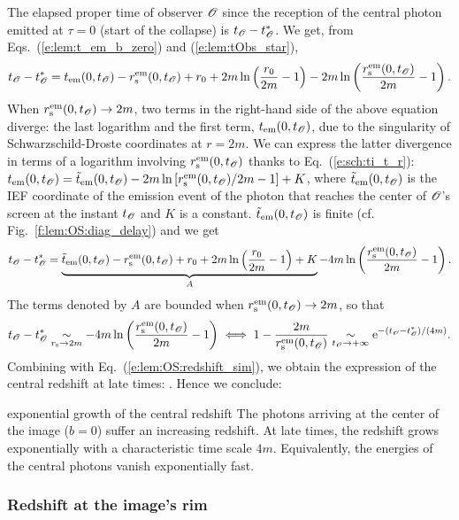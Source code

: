 The elapsed proper time of observer $\mathscr{O}$
since the reception of the central photon emitted
at $\tau = 0$ (start of the collapse) is $t_{\mathscr{O}} - t_{\mathscr{O}}^*$.
We get, from Eqs.~(\ref{e:lem:t_em_b_zero}) and (\ref{e:lem:tObs_star}),
\[
    t_{\mathscr{O}} - t_{\mathscr{O}}^* =  t_{\rm em}(0, t_{\mathscr{O}}) - r_{\rm s}^{\rm em}(0,t_{\mathscr{O}}) + r_0
        + 2m \ln\left(\frac{r_0}{2m} - 1 \right)
        - 2m \ln\left(\frac{r_{\rm s}^{\rm em}(0,t_{\mathscr{O}})}{2m} - 1 \right) .
\]
When $r_{\rm s}^{\rm em}(0,t_{\mathscr{O}}) \to 2m$, two terms in the right-hand side
of the above equation diverge: the last logarithm and the first term,
$t_{\rm em}(0, t_{\mathscr{O}})$, due to the singularity of Schwarzschild-Droste coordinates
at $r=2m$. We can express the latter divergence in terms of a logarithm
involving $r_{\rm s}^{\rm em}(0,t_{\mathscr{O}})$ thanks to Eq.~(\ref{e:sch:ti_t_r}):
$t_{\rm em}(0, t_{\mathscr{O}}) = {\tilde t}_{\rm em}(0,t_{\mathscr{O}}) - 2m
\ln\left[ {r_{\rm s}^{\rm em}(0,t_{\mathscr{O}})}/{2m}  - 1 \right] + K$,
where ${\tilde t}_{\rm em}(0,t_{\mathscr{O}})$ is the IEF coordinate
of the emission event of the photon that reaches the center of $\mathscr{O}$'s screen
at the instant $t_{\mathscr{O}}$
and $K$ is a constant.
${\tilde t}_{\rm em}(0,t_{\mathscr{O}})$ is finite (cf. Fig.~\ref{f:lem:OS:diag_delay})
and we get
\[
    t_{\mathscr{O}} - t_{\mathscr{O}}^* = \underbrace{{\tilde t}_{\rm em}(0,t_{\mathscr{O}}) - r_{\rm s}^{\rm em}(0,t_{\mathscr{O}}) + r_0
    + 2 m \ln \left( \frac{r_0}{2m} - 1 \right) + K}_{A}
    -  4 m \ln \left( \frac{r_{\rm s}^{\rm em}(0,t_{\mathscr{O}})}{2 m}  - 1 \right) .
\]
The terms denoted by $A$ are bounded when $r_{\rm s}^{\rm em}(0,t_{\mathscr{O}}) \to 2m$, so that
\[
    t_{\mathscr{O}} - t_{\mathscr{O}}^*  \underset{r_{\rm s}\to 2m}{\sim} -  4 m \ln \left( \frac{r_{\rm s}^{\rm em}(0,t_{\mathscr{O}})}{2 m}  - 1 \right)
    \iff 1 - \frac{2m}{r_{\rm s}^{\rm em}(0,t_{\mathscr{O}})}
    \underset{t_{\mathscr{O}} \to +\infty}{\sim} \mathrm{e}^{-(t_{\mathscr{O}} - t_{\mathscr{O}}^*)/(4 m)} .
\]
Combining with Eq.~(\ref{e:lem:OS:redshift_sim}), we obtain the expression
of the central redshift at late times:
\be \label{e:lem:central_redshift}
    .
\ee
Hence we conclude:
\begin{tprop}{exponential growth of the central redshift}{}
The photons arriving at the center of the image ($b=0$) suffer an
increasing redshift. At late times, the redshift grows exponentially
with a characteristic time scale $4 m$. Equivalently, the energies of the central photons
vanish exponentially fast.
\end{tprop}

\subsubsection{Redshift at the image's rim}

